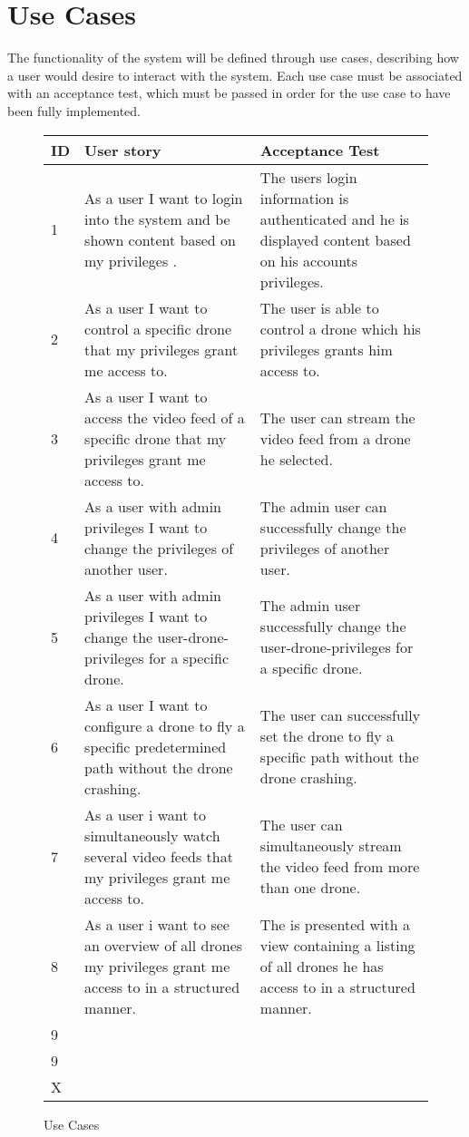 \section{Use Cases}
The functionality of the system will be defined through use cases, describing how a user would desire to interact with the system.
Each use case must be associated with an acceptance test, which must be passed in order for the use case to have been fully implemented.

\begin{figure}[H]
\begin{center}
\begin{tabular}{ | l | p{6cm} | p{6cm} | }
  \hline              
	\textbf{ID} & \textbf{User story} & \textbf{Acceptance Test} \\ \hline
	1 & As a user I want to login into the system and be shown content based on my privileges .& The users login information is authenticated and he is displayed content based on his accounts privileges.\\ \hline
	2 & As a user I want to control a specific drone that my privileges grant me access to. & The user is able to control a drone which his privileges grants him access to. \\ \hline
	3 & As a user I want to access the video feed of a specific drone that my privileges grant me access to. & The user can stream the video feed from a drone he selected.\\ \hline
	4 & As a user with admin privileges I want to change the privileges of another user. & The admin user can successfully change the privileges of another user. \\ \hline
	5 & As a user with admin privileges I want to change the user-drone-privileges for a specific drone. & The admin user successfully change the user-drone-privileges for a specific drone. \\ \hline
	6 & As a user I want to configure a drone to fly a specific predetermined path without the drone crashing. & The user can successfully set the drone to fly a specific path without the drone crashing. \\ \hline
	7 & As a user i want to simultaneously watch several video feeds that my privileges grant me access to. & The user can simultaneously stream the video feed from more than one drone. \\ \hline
	8 & As a user i want to see an overview of all drones my privileges grant me access to in a structured manner. &  The is presented with a view containing a listing of all drones he has access to in a structured manner.\\ \hline
	9 & &  \\ \hline
	9 & &  \\ \hline
	X & &  \\ 
  \hline  
\end{tabular}

\caption{Use Cases}
\label{tab:use_cases}
\end{center}
\end{figure}